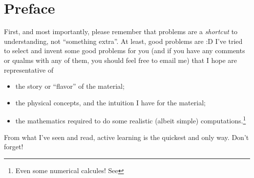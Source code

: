 \section*{Preface}



First, and most importantly, please remember that problems are a \textit{shortcut} to understanding, not ``something extra''.
%
At least, good problems are :D
%
I've tried to select and invent some good problems for you (and if you have any comments or qualms with any of them, you should feel free to email me) that I hope are representative of
\begin{itemize}
    \item
        the story or ``flavor'' of the material;

    \item
        the physical concepts, and the intuition I have for the material;

    \item
        the mathematics required to do some realistic (albeit simple) computations.\footnote{Even some numerical calcules! See \Sec{}}
\end{itemize}
%
From what I've seen and read, active learning is the quickest and only way.
%
Don't forget!

